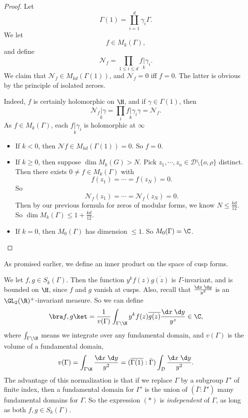 \documentclass[a4paper]{article}
\begin{document}
\begin{proof}
  Let
  \[
    \Gamma(1) = \coprod_{i = 1}^d \gamma_i \Gamma.
  \]
  We let
  \[
    f \in M_k(\Gamma),
  \]
  and define
  \[
    \mathcal{N}_f = \prod_{1 \leq i \leq d} f\underset{k}{|} \gamma_i.
  \]
  We claim that $\mathcal{N}_f \in M_{kd} (\Gamma(1))$, and $\mathcal{N}_f = 0$ iff $f = 0$. The latter is obvious by the principle of isolated zeroes.

  Indeed, $f$ is certainly holomorphic on $\H$, and if $\gamma \in \Gamma(1)$, then
  \[
    \mathcal{N}_f\underset{k}{|} \gamma = \prod_i f\underset{k}{|} \gamma_i \gamma = \mathcal{N}_f.
  \]
  As $f \in M_k(\Gamma)$, each $f\underset{k}{|} \gamma_i$ is holomorphic at $\infty$

  \begin{itemize}
    \item If $k < 0$, then $\mathcal{N}f \in M_{kd} (\Gamma(1)) = 0$. So $f = 0$.
    \item If $k \geq 0$, then suppose $\dim M_k(G) > N$. Pick $z_1, \cdots, z_n \in \mathcal{D} \setminus \{o, \rho\}$ distinct. Then there exists $0 \not= f \in M_k(\Gamma)$ with
      \[
        f(z_1) = \cdots = f(z_N) = 0.
      \]
      So
      \[
        \mathcal{N}_f(z_1) = \cdots = \mathcal{N}_f (z_N) = 0.
      \]
      Then by our previous formula for zeros of modular forms, we know $N \leq \frac{kd}{12}$. So $\dim M_k(\Gamma) \leq1 + \frac{kd}{12}$.
    \item If $k = 0$, then $M_0(\Gamma)$ has dimension $\leq 1$. So $M_0(\Gamma) = \C$.
  \end{itemize}
\end{proof}
As promised earlier, we define an inner product on the space of cusp forms.

We let $f, g \in S_k(\Gamma)$. Then the function $y^k f(z) \overline{g(z)}$ is $\Gamma$-invariant, and is bounded on $\H$, since $f$ and $g$ vanish at cusps. Also, recall that $\frac{\d x\; \d y}{y^2}$ is an $\GL_2(\R)^+$-invariant measure. So we can define
\[
  \bra f, g\ket = \frac{1}{v(\Gamma)} \int_{\Gamma \setminus \H} y^k f(z) \overline{g(z)} \frac{\d x\; \d y}{y^z} \in \C,
\]
where $\int_{\Gamma \setminus \H}$ means we integrate over any fundamental domain, and $v(\Gamma)$ is the volume of a fundamental domain,
\[
  v(\Gamma) = \int_{\Gamma \H} \frac{\d x\; \d y}{y^2} = (\overline{\Gamma(1)}:\bar{\Gamma}) \int_\mathcal{D} \frac{\d x\;\d y}{y^2}.
\]
The advantage of this normalization is that if we replace $\Gamma$ by a subgroup $\Gamma'$ of finite index, then a fundamental domain for $\Gamma'$ is the union of $(\bar{\Gamma}: \bar{\Gamma}')$ many fundamental domains for $\Gamma$. So the expression $(*)$ is \emph{independent} of $\Gamma$, as long as both $f, g \in S_k(\Gamma)$.
\end{document}
